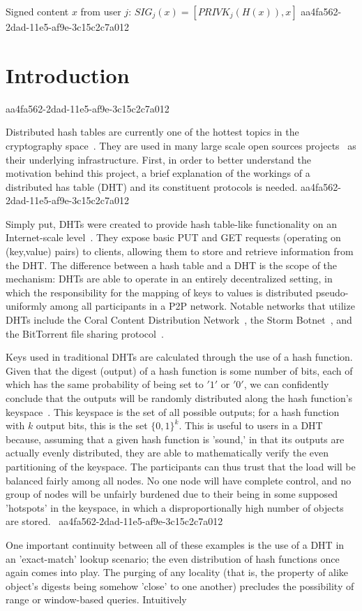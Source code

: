 \documentclass[12pt]{article}
\begin{document}
Signed content $x$ from user $j$: $SIG_j(x) = \left[ PRIVK_j( H(x) ), x \right]$
aa4fa562-2dad-11e5-af9e-3c15c2c7a012
\section{Introduction}
aa4fa562-2dad-11e5-af9e-3c15c2c7a012\par Distributed hash tables are currently one of the hottest topics in the cryptography space~\cite{Stoica:2001dj,Rowstron:2001ea,Ratnasamy:2001wn}. They are used in many large scale open sources projects~\cite{Freitas:2013tb,Xu:2010vs,Perfitt:2010fh} as their underlying infrastructure. First, in order to better understand the motivation behind this project, a brief explanation of the workings of a distributed has table (DHT) and its constituent protocols is needed.
aa4fa562-2dad-11e5-af9e-3c15c2c7a012
\par Simply put, DHTs were created to provide hash table-like functionality on an Internet-scale level~\cite{Ratnasamy:2001wn}. They expose basic PUT and GET requests (operating on (key,value) pairs) to clients, allowing them to store and retrieve information from the DHT. The difference between a hash table and a DHT is the scope of the mechanism: DHTs are able to operate in an entirely decentralized setting, in which the responsibility for the mapping of keys to values is distributed pseudo-uniformly among all participants in a P2P network. Notable networks that utilize DHTs include the Coral Content Distribution Network~\cite{Freedman:2004vb}, the Storm Botnet~\cite{Holz:2008uk}, and the BitTorrent file sharing protocol~\cite{Cohen:y1_8mBnw}.

\par Keys used in traditional DHTs are calculated through the use of a hash function. Given that the digest (output) of a hash function is some number of bits, each of which has the same probability of being set to $'1'$ or $'0'$, we can confidently conclude that the outputs will be randomly distributed along the hash function's keyspace~. This keyspace is the set of all possible outputs; for a hash function with $k$ output bits, this is the set $\{0,1\}^k$. This is useful to users in a DHT because, assuming that a given hash function is 'sound,' in that its outputs are actually evenly distributed, they are able to mathematically verify the even partitioning of the keyspace. The participants can thus trust that the load will be balanced fairly among all nodes. No one node will have complete control, and no group of nodes will be unfairly burdened due to their being in some supposed 'hotspots' in the keyspace, in which a disproportionally high number of objects are stored.~
aa4fa562-2dad-11e5-af9e-3c15c2c7a012
\par One important continuity between all of these examples is the use of a DHT in an 'exact-match' lookup scenario; the even distribution of hash functions once again comes into play. The purging of any locality (that is, the property of alike object's digests being somehow 'close' to one another) precludes the possibility of range or window-based queries. Intuitively
\end{document}
